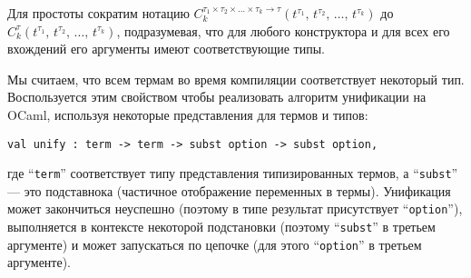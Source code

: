 \noindent Для простоты сократим нотацию  $C_k^{\tau_1\times\tau_2\times\dots\times\tau_k\to\tau}(t^{\tau_1},\,t^{\tau_2},\,\dots,\,t^{\tau_k})$ до
$C_k^\tau(t^{\tau_1},\,t^{\tau_2},\,\dots,\,t^{\tau_k})$, подразумевая, что для любого конструктора и для всех его вхождений его аргументы имеют соответствующие типы.


\begin{comment}
We need also to define the notion of a subterm  $t^\tau[p]$ of a term $t^\tau$ at given position $p$:

$$
\begin{array}{rcl}
 p=\epsilon\mid\{1, 2, 3,\dots\}\bullet p&-&\mbox{the set of positions}\\
 t^\tau[\epsilon]=t^\tau&-&\mbox{base case}\\
 C_k^\tau(t_1^{\tau_1},\,t_2^{\tau_2},\dots,\,t_k^{\tau_k})[i\bullet p]=t_i^{\tau_i}[p], 1\le i \le k&-&\mbox{inductive case}
\end{array}
$$
\end{comment}

Мы считаем, что всем термам во время компиляции соответствует некоторый тип.
Воспользуется этим свойством чтобы реализовать алгоритм унификации на OCaml, используя некоторые представления для термов и типов:

\begin{lstlisting}[mathescape=true]
    val unify : term -> term -> subst option -> subst option,
\end{lstlisting}

\noindent где \enquote{\lstinline=term=} соответствует типу представления типизированных термов, а \enquote{\lstinline=subst=} --- это подставнока (частичное отображение переменных в термы).
Унификация может закончиться неуспешно (поэтому в типе результат присутствует \enquote{\lstinline=option=}),
выполняется в контексте некоторой подстановки (поэтому \enquote{\lstinline=subst=} в третьем аргументе) и может запускаться по цепочке (для этого
\enquote{\lstinline=option=} в третьем аргументе).

